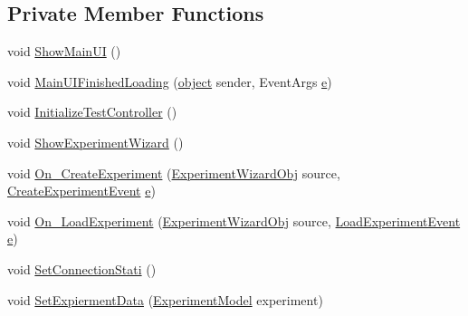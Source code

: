 \subsection*{Private Member Functions}
\begin{DoxyCompactItemize}
\item 
void \hyperlink{class_web_analyzer_1_1_controller_1_1_main_controller_aa87735ea9e190ab3221160fe4d232833}{Show\+Main\+U\+I} ()
\item 
void \hyperlink{class_web_analyzer_1_1_controller_1_1_main_controller_aab65da07ca7ce15a5957e7f01e260b86}{Main\+U\+I\+Finished\+Loading} (\hyperlink{_u_i_2_h_t_m_l_resources_2js_2lib_2underscore_8min_8js_aae18b7515bb2bc4137586506e7c0c903}{object} sender, Event\+Args \hyperlink{_u_i_2_h_t_m_l_resources_2js_2lib_2bootstrap_8min_8js_ab5902775854a8b8440bcd25e0fe1c120}{e})
\item 
void \hyperlink{class_web_analyzer_1_1_controller_1_1_main_controller_a547afe4ecfaa8fd487ee1665262374fe}{Initialize\+Test\+Controller} ()
\item 
void \hyperlink{class_web_analyzer_1_1_controller_1_1_main_controller_affb20dd05516641ec46676704f9c4a75}{Show\+Experiment\+Wizard} ()
\item 
void \hyperlink{class_web_analyzer_1_1_controller_1_1_main_controller_a128386d15417b0ae5e388f39d71c7535}{On\+\_\+\+Create\+Experiment} (\hyperlink{class_web_analyzer_1_1_u_i_1_1_interaction_objects_1_1_experiment_wizard_obj}{Experiment\+Wizard\+Obj} source, \hyperlink{class_web_analyzer_1_1_events_1_1_create_experiment_event}{Create\+Experiment\+Event} \hyperlink{_u_i_2_h_t_m_l_resources_2js_2lib_2bootstrap_8min_8js_ab5902775854a8b8440bcd25e0fe1c120}{e})
\item 
void \hyperlink{class_web_analyzer_1_1_controller_1_1_main_controller_abfc3aaeb8299f7890d08d7a150072b03}{On\+\_\+\+Load\+Experiment} (\hyperlink{class_web_analyzer_1_1_u_i_1_1_interaction_objects_1_1_experiment_wizard_obj}{Experiment\+Wizard\+Obj} source, \hyperlink{class_web_analyzer_1_1_events_1_1_load_experiment_event}{Load\+Experiment\+Event} \hyperlink{_u_i_2_h_t_m_l_resources_2js_2lib_2bootstrap_8min_8js_ab5902775854a8b8440bcd25e0fe1c120}{e})
\item 
void \hyperlink{class_web_analyzer_1_1_controller_1_1_main_controller_af163fb2f694b612e5bf4a854f09b119f}{Set\+Connection\+Stati} ()
\item 
void \hyperlink{class_web_analyzer_1_1_controller_1_1_main_controller_a9834e917d2a61f4d5adb424ed76e0622}{Set\+Expierment\+Data} (\hyperlink{class_web_analyzer_1_1_models_1_1_base_1_1_experiment_model}{Experiment\+Model} experiment)

\end{DoxyCompactItemize}
